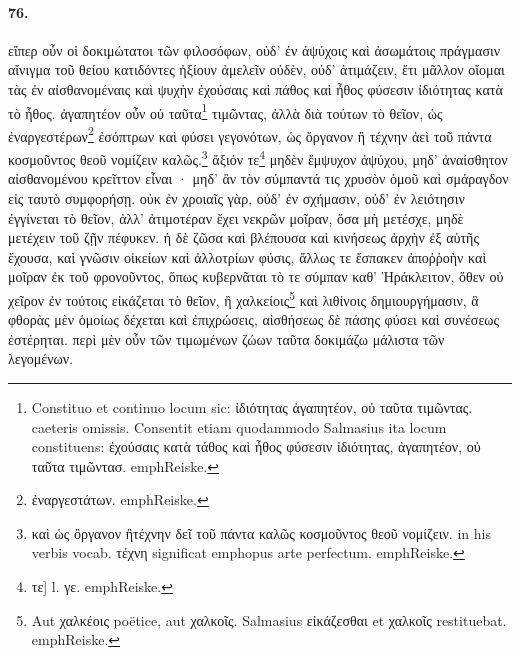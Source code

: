 \documentclass[a4paper, 11pt, oneside, polutonikogreek, german]{article}
\begin{document}
\paragraph{76.}
εἴπερ οὖν οἱ δοκιμώτατοι τῶν φιλοσόφων, οὐδ' ἐν ἀψύχοις καὶ ἀσωμάτοις πράγμασιν αἴνιγμα τοῦ θείου κατιδόντες ἠξίουν ἀμελεῖν οὐδὲν, οὐδ' ἀτιμάζειν, ἔτι μᾶλλον οἴομαι τὰς ἐν αἰσθανομέναις καὶ ψυχὴν ἐχούσαις καὶ πάθος καὶ ἦθος φύσεσιν ἰδιότητας κατὰ τὸ ἦθος. ἀγαπητέον οὖν οὐ ταῦτα\footnote{Constituo et continuo locum sic: ἰδιότητας ἀγαπητέον, οὐ ταῦτα τιμῶντας. caeteris omissis. Consentit etiam quodammodo Salmasius ita locum constituens: ἐχούσαις κατὰ τάθος καὶ ἦθος φύσεσιν ἰδιότητας, ἀγαπητέον, οὐ ταῦτα τιμῶντασ. emph{Reiske.}} τιμῶντας, ἀλλὰ διὰ τούτων τὸ θεῖον, ὡς ἐναργεστέρων\footnote{ἐναργεστάτων. emph{Reiske.}} ἐσόπτρων καὶ φύσει γεγονότων, ὡς ὄργανον ἢ τέχνην ἀεὶ τοῦ πάντα κοσμοῦντος θεοῦ νομίζειν καλῶς.\footnote{καὶ ὡς ὂργανον ἢτέχνην δεῖ τοῦ πάντα καλῶς κοσμοῦντος θεοῦ νομίζειν. in his verbis vocab. τέχνη significat emph{opus arte perfectum}. emph{Reiske.}} ἄξιόν τε\footnote{τε] l. γε. emph{Reiske.}} μηδὲν ἔμψυχον ἀψύχου, μηδ' ἀναίσθητον αἰσθανομένου κρεῖττον εἶναι · μηδ' ἂν τὸν σύμπαντά τις χρυσὸν ὁμοῦ καὶ σμάραγδον εἰς ταυτὸ συμφορήσῃ. οὐκ ἐν χροιαῖς γὰρ, οὐδ' ἐν σχήμασιν, οὐδ' ἐν λειότησιν ἐγγίνεται τὸ θεῖον, ἀλλ' ἀτιμοτέραν ἔχει νεκρῶν μοῖραν, ὅσα μὴ μετέσχε, μηδὲ μετέχειν τοῦ ζῇν πέφυκεν. ἡ δὲ ζῶσα καὶ βλέπουσα καὶ κινήσεως ἀρχὴν ἐξ αὑτῆς ἔχουσα, καὶ γνῶσιν οἰκείων καὶ ἀλλοτρίων φύσις, ἄλλως τε ἔσπακεν ἀποῤῥοὴν καὶ μοῖραν ἐκ τοῦ φρονοῦντος, ὅπως κυβερνᾶται τὸ τε σύμπαν καθ' Ἡράκλειτον, ὅθεν οὐ χεῖρον ἐν τούτοις εἰκάζεται τὸ θεῖον, ἢ χαλκείοις\footnote{Aut χαλκέοις poëtice, aut χαλκοῖς. Salmasius εἰκάζεσθαι et χαλκοῖς restituebat. emph{Reiske.}} καὶ λιθίνοις δημιουργήμασιν, ἃ φθορὰς μὲν ὁμοίως δέχεται καὶ ἐπιχρώσεις, αἰσθήσεως δὲ πάσης φύσει καὶ συνέσεως ἐστέρηται. περὶ μὲν οὖν τῶν τιμωμένων ζώων ταῦτα δοκιμάζω μάλιστα τῶν λεγομένων.
\end{document}
